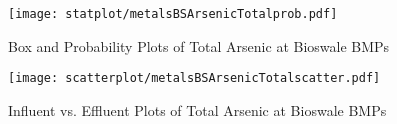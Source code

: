         \begin{figure}[hb]   %
            \centering
            \texttt{[image: statplot/metalsBSArsenicTotalprob.pdf]}
            \caption{Box and Probability Plots of Total Arsenic at Bioswale BMPs}
        \end{figure}         %
        
        
        \begin{figure}[hb]   %
            \centering
            \texttt{[image: scatterplot/metalsBSArsenicTotalscatter.pdf]}
            \caption{Influent vs. Effluent Plots of Total Arsenic at Bioswale BMPs}
        \end{figure}         %
        \clearpage
        